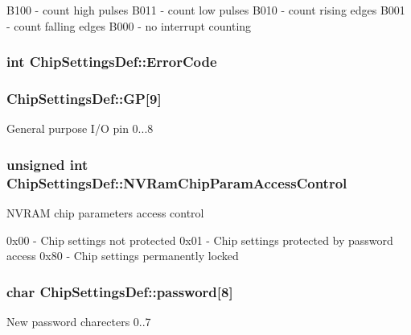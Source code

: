 \-B100 -\/ count high pulses \-B011 -\/ count low pulses \-B010 -\/ count rising edges \-B001 -\/ count falling edges \-B000 -\/ no interrupt counting \hypertarget{struct_chip_settings_def_a711cd7ddde92dcfefaba6863b303ab3d}{
\subsubsection[{\-Error\-Code}]{\setlength{\rightskip}{0pt plus 5cm}int {\bf \-Chip\-Settings\-Def\-::\-Error\-Code}}}\label{struct_chip_settings_def_a711cd7ddde92dcfefaba6863b303ab3d}
\hypertarget{struct_chip_settings_def_aea8065ee4c940dcbde93dd1633c63f38}{
\subsubsection[{\-G\-P}]{ {\bf \-Chip\-Settings\-Def\-::\-G\-P}\mbox{[}9\mbox{]}}}\label{struct_chip_settings_def_aea8065ee4c940dcbde93dd1633c63f38}
\-General purpose \-I/\-O pin 0...8 \hypertarget{struct_chip_settings_def_a56bcb330a04c9b6b108ee63ce635c92d}{
\subsubsection[{\-N\-V\-Ram\-Chip\-Param\-Access\-Control}]{\setlength{\rightskip}{0pt plus 5cm}unsigned int {\bf \-Chip\-Settings\-Def\-::\-N\-V\-Ram\-Chip\-Param\-Access\-Control}}}\label{struct_chip_settings_def_a56bcb330a04c9b6b108ee63ce635c92d}
\-N\-V\-R\-A\-M chip parameters access control

0x00 -\/ \-Chip settings not protected 0x01 -\/ \-Chip settings protected by password access 0x80 -\/ \-Chip settings permanently locked \hypertarget{struct_chip_settings_def_a0e9e9123c42b18bdd6294d0ae7935582}{
\subsubsection[{password}]{\setlength{\rightskip}{0pt plus 5cm}char {\bf \-Chip\-Settings\-Def\-::password}\mbox{[}8\mbox{]}}}\label{struct_chip_settings_def_a0e9e9123c42b18bdd6294d0ae7935582}
\-New password charecters 0..7

